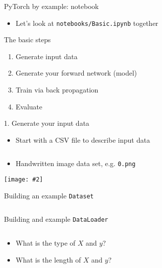 \documentclass[hyperref={pdfpagelabels=false},12pt]{beamer}
\newcommand{\ig}[2]{\texttt{[image: \#2]}}
\newcommand{\code}[2]{\texttt{#2}}
\newcommand{\python}[1]{\code{python}{#1}}
\newcommand{\pygment}[3]{\inputminted[bgcolor=lightgray,linenos,fontsize=#1]{#2}{#3}}
\newcommand{\pygmentLines}[5]{\inputminted[bgcolor=lightgray,linenos,fontsize=#1,firstline=#2,lastline=#3,autogobble]{#4}{#5}}
\begin{document}
\begin{frame}{PyTorch by example: notebook}
  \begin{itemize}
    \item Let's look at \texttt{notebooks/Basic.ipynb} together
  \end{itemize}
\end{frame}

\begin{frame}{The basic steps}
  \begin{enumerate}
      \item Generate input data
      \item Generate your forward network (model)
      \item Train via back propagation
      \item Evaluate
  \end{enumerate}
\end{frame}

\begin{frame}{1. Generate your input data}
  \begin{itemize}
    \item Start with a CSV file to describe input data
  \end{itemize}
  \pygmentLines{\scriptsize}{1}{5}{text}{data/mnist.csv}
  \begin{itemize}
    \item Handwritten image data set, e.g. \texttt{0.png}
  \end{itemize}
  \begin{center}
    \ig{0.25}{figures/0.png}
  \end{center}
\end{frame}

\begin{frame}{Building an example \python{Dataset}}
  \pygment{\scriptsize}{python}{code/basic-dataset.py}
\end{frame}

\begin{frame}{Building and example \python{DataLoader}}
  \pygment{\scriptsize}{python}{code/basic-dataloader.py}
  \vspace{-0.5cm}
  \begin{itemize}
    \item What is the type of $X$ and $y$?
    \item What is the length of $X$ and $y$?
  \end{itemize}
\end{frame}
\end{document}
